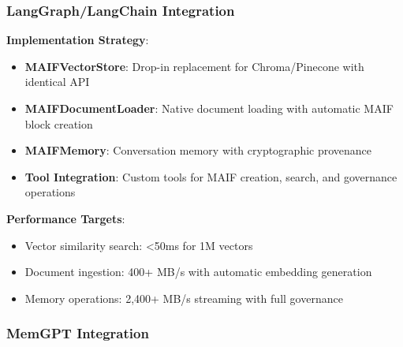 \documentclass[conference]{IEEEtran}
\begin{document}
\subsubsection{LangGraph/LangChain Integration}

\textbf{Implementation Strategy}:
\begin{itemize}[leftmargin=*]
\item \textbf{MAIFVectorStore}: Drop-in replacement for Chroma/Pinecone with identical API
\item \textbf{MAIFDocumentLoader}: Native document loading with automatic MAIF block creation
\item \textbf{MAIFMemory}: Conversation memory with cryptographic provenance
\item \textbf{Tool Integration}: Custom tools for MAIF creation, search, and governance operations
\end{itemize}

\textbf{Performance Targets}:
\begin{itemize}[leftmargin=*]
\item Vector similarity search: <50ms for 1M vectors
\item Document ingestion: 400+ MB/s with automatic embedding generation
\item Memory operations: 2,400+ MB/s streaming with full governance
\end{itemize}

\subsubsection{MemGPT Integration}
\end{document}
